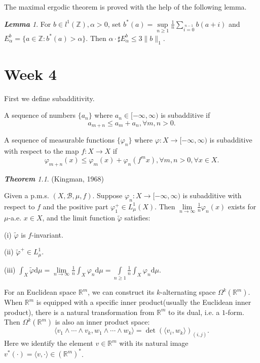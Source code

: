 \documentclass[10pt, a4paper, oneside]{report}
\numberwithin{equation}{chapter}
\theoremstyle{remark}
\newtheorem{theorem}[definition]{\bf{Theorem}}
\newtheorem{lemma}[definition]{\bf{Lemma}}
\theoremstyle{remark}
\begin{document}
    The maximal ergodic theorem is proved with the help of the following lemma.

\begin{lemma}
    For $b\in l^1(\mathbb{Z}),\alpha>0$, set $b^*(a)=\sup\limits_{n\geqslant 1}\frac{1}{n}\sum\limits_{i=0}\limits^{n-1}b(a+i)$ and $E_\alpha^b=\{a\in\mathbb{Z}:b^*(a)>\alpha\}$. Then $\alpha\cdot\sharp E_\alpha^b\leqslant 3\|b\|_1.$
\end{lemma}

\chapter{Week 4}
    First we define subadditivity.

    A sequence of numbers $\{a_n\}$ where $a_n\in[-\infty,\infty)$ is subadditive if $$a_{m+n}\leqslant a_m+a_n,\forall m,n>0.$$

    A sequence of measurable functions $\{\varphi_n\}$ where $\varphi:X\rightarrow[-\infty,\infty)$ is subadditive with respect to the map $f:X\rightarrow X$ if $$\varphi_{m+n}(x)\leqslant\varphi_m(x)+\varphi_n(f^mx),\forall m,n>0,\forall x\in X.$$

\begin{theorem}
(Kingman, 1968)

    Given a p.m.s. $(X,\mathcal{B},\mu,f)$. Suppose $\varphi_n:X\rightarrow[-\infty,\infty)$ is subadditive with respect to $f$ and the positive part $\varphi_1^+\in L_\mu^1(X)$. Then $\lim\limits_{n\to\infty}\frac{1}{n}\varphi_n(x)$
exists for $\mu$-a.e. $x\in X$, and the limit function $\tilde{\varphi}$ satisfies:

    (i) $\tilde{\varphi}$ is $f$-invariant.

    (ii) $\tilde{\varphi}^+\in L_\mu^1$.

    (iii) $\int_X\tilde{\varphi}\mathrm{d}\mu=\lim\limits_{n\to\infty}\frac{1}{n}\int_X\varphi_n\mathrm{d}\mu=\int\limits_{n\geqslant 1}\frac{1}{n}\int_X\varphi_n\mathrm{d}\mu.$
\end{theorem}

    For an Euclidean space $\mathbb{R}^m$, we can construct its $k$-alternating space $\Omega^k(\mathbb{R}^m).$ When $\mathbb{R}^m$ is equipped with a specific inner product(usually the Euclidean inner product), there is a natural transformation from $\mathbb{R}^m$ to 
    its dual, i.e. a $1$-form. Then $\Omega^k(\mathbb{R}^m)$ is also an inner product space: 
    $$\langle v_1\wedge\cdots\wedge v_k,w_1\wedge\cdots\wedge w_k\rangle=\det(\langle v_i,w_k\rangle)_{(i,j)}.$$
    Here we identify the element $v\in\mathbb{R}^m$ with its natural image $v^*(\cdot)=\langle v,\cdot\rangle\in(\mathbb{R}^m)^*$.
\end{document}
